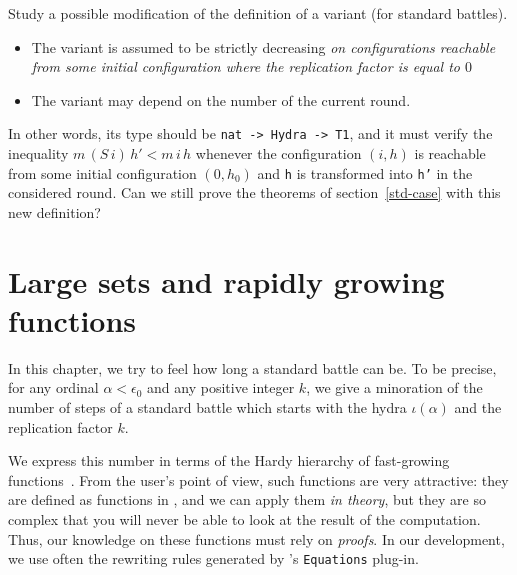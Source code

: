 \documentclass[a4paper]{book}
\begin{document}
\begin{project}
Study a possible modification of the definition of a variant  (for  standard battles).

\begin{itemize}
\item The variant is assumed to be strictly decreasing \emph{on configurations 
reachable from some initial configuration where the replication factor is equal to $0$}
\item The variant may depend on the number of the current round.
\end{itemize}

In other words, its type should be \texttt{nat -> Hydra -> T1}, and it must 
verify the inequality $m\, (S\,i)\, h' < m\,i\, h$ whenever the configuration 
$(i,h)$ is reachable from some initial configuration $(0,h_0)$
and \texttt{h} is transformed into \texttt{h'} in the considered round.
Can we still prove the theorems of section~\ref{std-case} with this new definition?

\end{project}



\chapter{Large sets and rapidly growing functions}\label{chap:alpha-large}



In this chapter, we try to feel how long a standard battle can be.
To be precise, for any ordinal $\alpha<\epsilon_0$ and any positive integer $k$,
we give a minoration of the number of steps of a standard battle which
starts with the hydra $\iota(\alpha)$ and the replication factor $k$.

We express this number in terms of the Hardy hierarchy of fast-growing 
functions~\cite{BW85, Wainer1970, KS81, Promel2013}.
 From the \coq{} user's point of view, such  functions are  very 
attractive:  they are defined as functions  in \gallina{}, and we can apply them \emph{in theory}, but they are so complex that you will never be able to look at the result of the computation.
 Thus, our knowledge on these functions must rely on \emph{proofs}. In our development, we use often the rewriting rules generated by \coq's \texttt{Equations} plug-in.
\end{document}
